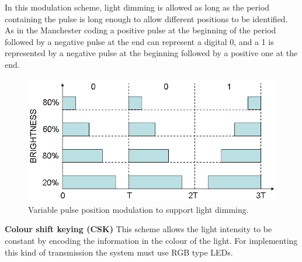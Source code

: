 In this modulation scheme, light dimming is allowed as long as the period containing the pulse is long enough to allow different positions to be identified. 
As in the Manchester coding a positive pulse at the beginning of the period followed by a negative pulse at the end can represent a digital 0, and a 1 is represented by a negative pulse at the beginning followed by a positive one at the end.\\
\newline
\begin{figure}[H]
\centering
\includegraphics[scale=0.3]{img/VPPM}
\caption{Variable pulse position modulation to support light dimming.}
\label{fig:ookmod}
\end{figure}
\textbf{Colour shift keying (CSK)}\newline
This scheme allows the light intensity to be constant by encoding the information in the colour of the light.
For implementing this kind of transmission the system must use RGB type LEDs.


